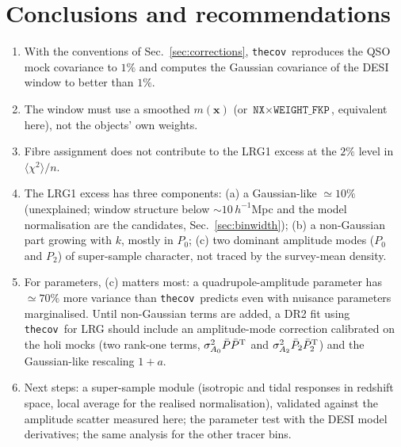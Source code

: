 \documentclass[11pt]{article}
\newcommand{\thecov}{\texttt{thecov}}
\begin{document}
\section{Conclusions and recommendations}
\label{sec:conclusions}

\begin{enumerate}
\item With the conventions of Sec.~\ref{sec:corrections}, \thecov\ reproduces the QSO mock covariance to $1\%$ and computes the Gaussian covariance of the DESI window to better than $1\%$.
\item The window must use a smoothed $m(\mathbf{x})$ (or $\texttt{NX}\times\texttt{WEIGHT\_FKP}$, equivalent here), not the objects' own weights.
\item Fibre assignment does not contribute to the LRG1 excess at the $2\%$ level in $\langle\chi^2\rangle/n$.
\item The LRG1 excess has three components: (a) a Gaussian-like $\simeq10\%$ (unexplained; window structure below $\sim10\,h^{-1}$Mpc and the model normalisation are the candidates, Sec.~\ref{sec:binwidth}); (b) a non-Gaussian part growing with $k$, mostly in $P_0$; (c) two dominant amplitude modes ($P_0$ and $P_2$) of super-sample character, not traced by the survey-mean density.
\item For parameters, (c) matters most: a quadrupole-amplitude parameter has $\simeq70\%$ more variance than \thecov\ predicts even with nuisance parameters marginalised. Until non-Gaussian terms are added, a DR2 fit using \thecov\ for LRG should include an amplitude-mode correction calibrated on the holi mocks (two rank-one terms, $\sigma^2_{A_0}\bar P\bar P^{\rm T}$ and $\sigma^2_{A_2}\bar P_2\bar P_2^{\rm T}$) and the Gaussian-like rescaling $1+a$.
\item Next steps: a super-sample module (isotropic and tidal responses in redshift space, local average for the realised normalisation), validated against the amplitude scatter measured here; the parameter test with the DESI model derivatives; the same analysis for the other tracer bins.
\end{enumerate}
\end{document}
